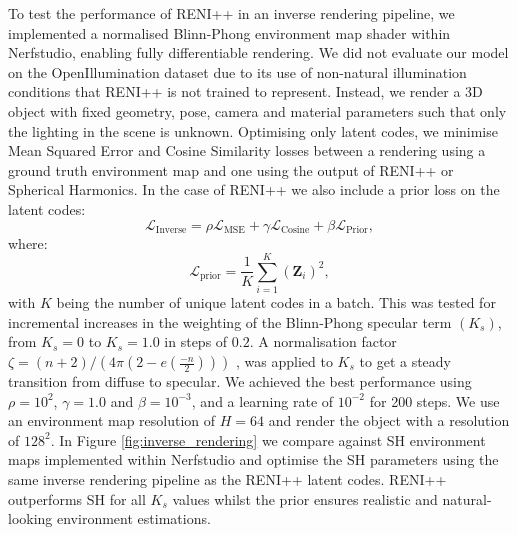 To test the performance of RENI++ in an inverse rendering pipeline, we implemented a normalised Blinn-Phong environment map shader within Nerfstudio, enabling fully differentiable rendering. We did not evaluate our model on the OpenIllumination dataset \cite{isabellaliulinghaochenOpenIlluminationMultiIlluminationDataset2023} due to its use of non-natural illumination conditions that RENI++ is not trained to represent. Instead, we render a 3D object with fixed geometry, pose, camera and material parameters such that only the lighting in the scene is unknown. Optimising only latent codes, we minimise Mean Squared Error and Cosine Similarity losses between a rendering using a ground truth environment map and one using the output of RENI++ or Spherical Harmonics. In the case of RENI++ we also include a prior loss on the latent codes:
\begin{equation}\label{inverse_loss}
    \mathcal{L}_{\text{Inverse}} = \rho \mathcal{L}_{\text{MSE}} + \gamma \mathcal{L}_{\text{Cosine}} + \beta \mathcal{L}_{\text{Prior}},
\end{equation}
where:
\begin{equation}\label{prior_loss}
    \mathcal{L}_{\text{prior}} = \frac{1}{K} \sum_{i=1}^K \left( \mathbf{Z}_i \right)^2,
\end{equation}
with $K$ being the number of unique latent codes in a batch.
This was tested for incremental increases in the weighting of the Blinn-Phong specular term $(K_{s})$, from $K_{s} = 0$ to $K_{s} = 1.0$ in steps of $0.2$. A normalisation factor \(\zeta = (n+2) / (4\pi(2-e(\frac{-n}{2})))\) \cite{gotanda_physically-based_2010}, was applied to $K_{s}$ to get a steady transition from diffuse to specular. We achieved the best performance using $\rho = 10^{2}$, $\gamma = 1.0$ and $\beta = 10^{-3}$, and a learning rate of \(10^{-2}\) for 200 steps. We use an environment map resolution of $H=64$ and render the object with a resolution of $128^{2}$. In Figure \ref{fig:inverse_rendering} we compare against SH environment maps implemented within Nerfstudio and optimise the SH parameters using the same inverse rendering pipeline as the RENI++ latent codes. RENI++ outperforms SH for all $K_{s}$ values whilst the prior ensures realistic and natural-looking environment estimations.

